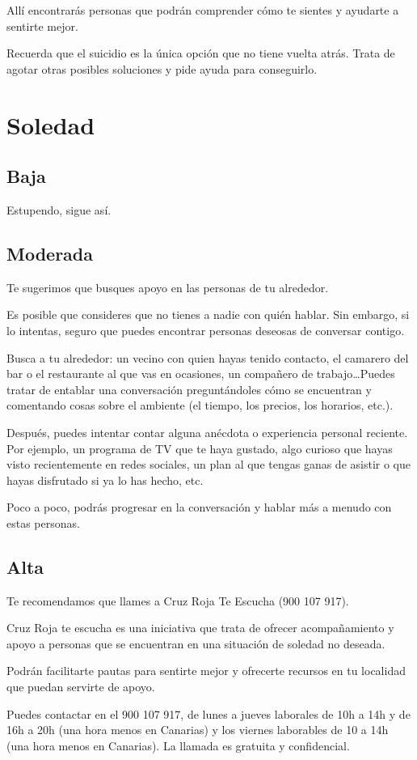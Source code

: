             Allí encontrarás personas que podrán comprender cómo te sientes y ayudarte a sentirte mejor. 
            
            Recuerda que el suicidio es la única opción que no tiene vuelta atrás. Trata de agotar otras posibles 
            soluciones y pide ayuda para conseguirlo.
    
    \section{Soledad}
        \subsection{Baja}
            Estupendo, sigue así. 
        \subsection{Moderada}
            Te sugerimos que busques apoyo en las personas de tu alrededor.

            Es posible que consideres que no tienes a nadie con quién hablar. Sin embargo, si lo intentas, seguro 
            que puedes encontrar personas deseosas de conversar contigo.
            
            Busca a tu alrededor: un vecino con quien hayas tenido contacto, el camarero del bar o el restaurante 
            al que vas en ocasiones, un compañero de trabajo…Puedes tratar de entablar una conversación 
            preguntándoles cómo se encuentran y comentando cosas sobre el ambiente (el tiempo, los precios, 
            los horarios, etc.).
            
            Después, puedes intentar contar alguna anécdota o experiencia personal reciente. Por ejemplo, 
            un programa de TV que te haya gustado, algo curioso que hayas visto recientemente en redes sociales, 
            un plan al que tengas ganas de asistir o que hayas disfrutado si ya lo has hecho, etc.
           
            Poco a poco, podrás progresar en la conversación y hablar más a menudo con estas personas.

        \subsection{Alta}
            Te recomendamos que llames a Cruz Roja Te Escucha (900 107 917).

            Cruz Roja te escucha es una iniciativa que trata de ofrecer acompañamiento y apoyo a personas que 
            se encuentran en una situación de soledad no deseada. 
            
            Podrán facilitarte pautas para sentirte mejor y ofrecerte recursos en tu localidad que puedan servirte 
            de apoyo. 
            
            Puedes contactar en el 900 107 917, de lunes a jueves laborales de 10h a 14h y de 16h a 20h 
            (una hora menos en Canarias) y los viernes laborables de 10 a 14h (una hora menos en Canarias). La 
            llamada es gratuita y confidencial.

    